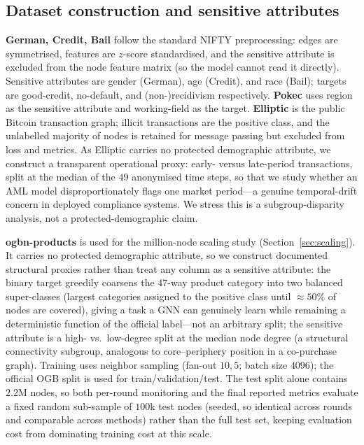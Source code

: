 \begin{appendices}
\section{Dataset construction and sensitive attributes}
\label{app:data}
\textbf{German, Credit, Bail} follow the standard NIFTY preprocessing: edges are
symmetrised, features are $z$-score standardised, and the sensitive attribute is
excluded from the node feature matrix (so the model cannot read it directly).
Sensitive attributes are gender (German), age (Credit), and race (Bail); targets
are good-credit, no-default, and (non-)recidivism respectively. \textbf{Pokec}
uses region as the sensitive attribute and working-field as the target.
\textbf{Elliptic} is the public Bitcoin transaction graph; illicit transactions
are the positive class, and the unlabelled majority of nodes is retained for
message passing but excluded from loss and metrics. As Elliptic carries no
protected demographic attribute, we construct a transparent operational proxy:
early- versus late-period transactions, split at the median of the $49$
anonymised time steps, so that we study whether an AML model disproportionately
flags one market period---a genuine temporal-drift concern in deployed
compliance systems. We stress this is a subgroup-disparity analysis, not a
protected-demographic claim.

\textbf{ogbn-products} is used for the million-node scaling study
(Section~\ref{sec:scaling}). It carries no protected demographic attribute, so
we construct documented structural proxies rather than treat any column as a
sensitive attribute: the binary target greedily coarsens the 47-way product
category into two balanced super-classes (largest categories assigned to the
positive class until $\approx\!50\%$ of nodes are covered), giving a task a
GNN can genuinely learn while remaining a deterministic function of the
official label---not an arbitrary split; the sensitive attribute is a
high- vs.\ low-degree split at the median node degree (a structural
connectivity subgroup, analogous to core–periphery position in a co-purchase
graph). Training uses neighbor sampling (fan-out $10,5$; batch size $4096$);
the official OGB split is used for train/validation/test. The test split
alone contains $2.2$M nodes, so both per-round monitoring and the final
reported metrics evaluate a fixed random sub-sample of $100$k test nodes
(seeded, so identical across rounds and comparable across methods) rather
than the full test set, keeping evaluation cost from dominating training
cost at this scale.


\end{appendices}
